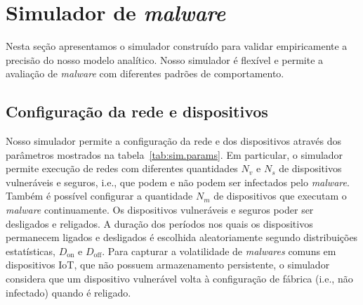 \section{Simulador de \emph{malware}}
\label{sec:sim}

Nesta seção apresentamos o simulador construído para validar
empiricamente a precisão do nosso modelo analítico.  Nosso simulador
é flexível e permite a avaliação de \emph{malware} com diferentes
padrões de comportamento.

\subsection{Configuração da rede e dispositivos}

Nosso simulador permite a configuração da rede e dos dispositivos
através dos parâmetros mostrados na tabela~\ref{tab:sim.params}.  Em
particular, o simulador permite execução de redes com diferentes
quantidades $N_v$ e $N_s$ de dispositivos vulneráveis
e seguros, i.e., que podem e não podem ser infectados pelo
\emph{malware}.  Também é possível configurar a quantidade $N_m$ de
dispositivos que executam o \emph{malware} continuamente.  Os
dispositivos vulneráveis e seguros poder ser desligados
e religados.  A duração dos períodos nos quais os dispositivos
permanecem ligados e desligados é escolhida aleatoriamente segundo
distribuições estatísticas, $D_\textrm{on}$ e $D_\textrm{off}$.
Para capturar a volatilidade de \emph{malwares} comuns em
dispositivos IoT, que não possuem armazenamento persistente,
o simulador considera que um dispositivo vulnerável volta
à configuração de fábrica (i.e., não infectado) quando é religado.

